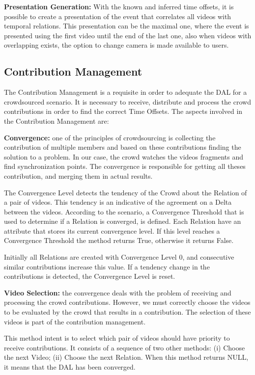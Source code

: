 \documentclass[sigconf]{acmart}
\begin{document}
	\textbf{Presentation Generation:} With the known and inferred time offsets, it is possible to create a presentation of the event that correlates all videos with temporal relations. This presentation can be the maximal one, where the event is presented using the first video until the end of the last one, also when videos with overlapping exists, the option to change camera is made available to users.

\subsection{Contribution Management}
The Contribution Management is a requisite in order to adequate the DAL for a crowdsourced scenario. It is necessary to receive, distribute and process the crowd contributions in order to find the correct Time Offsets. The aspects involved in the Contribution Management are:

	\textbf{Convergence:} one of the principles of crowdsourcing is collecting the contribution of multiple members and based on these contributions finding the solution to a problem. In our case, the crowd watches the videos fragments and find synchronization points. The convergence is responsible for getting all theses contribution, and merging them in actual results.
	
	The Convergence Level detects the tendency of the Crowd about the Relation of a pair of videos. This tendency is an indicative of the agreement on a Delta between the videos. According to the scenario, a Convergence Threshold that is used to determine if a Relation is converged, is defined. Each Relation have an attribute that stores its current convergence level. If this level reaches a Convergence Threshold the method returns True, otherwise it returns False.

	Initially all Relations are created with Convergence Level 0, and consecutive similar contributions increase this value. If a tendency change in the contributions is detected, the Convergence Level is reset.
	
	\textbf{Video Selection:} the convergence deals with the problem of receiving and processing the crowd contributions. However, we must correctly choose the videos to be evaluated by the crowd that results in a contribution. The selection of these videos is part of the contribution management. 
	
	This method intent is to select which pair of videos should have priority to receive contributions. It consists of a sequence of two other methods: (i) Choose the next Video; (ii) Choose the next Relation. When this method returns NULL, it means that the DAL has been converged.
	
\end{document}
